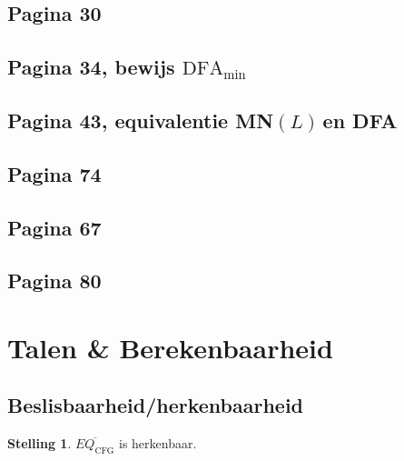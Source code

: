 \documentclass[kulak]{kulakarticle}
\newcommand{\DFA}{\text{DFA}}
\newcommand{\CFG}{\text{CFG}}
\newcommand{\mnl}{MN\((L)\)}
\theoremstyle{definition}
\newtheorem*{stelling}{Stelling}
\begin{document}
	

	\subsection*{Pagina 30}

	

	\newpage
	\subsection*{Pagina 34, bewijs \( \DFA_{\text{min}} \)}

	

	\newpage
	\subsection*{Pagina 43, equivalentie \mnl \,en DFA}

	

	\subsection*{Pagina 74}

	

	\subsection*{Pagina 67}

	

	\newpage
	\subsection*{Pagina 80}

	

	\newpage

	\section{Talen \& Berekenbaarheid}

	\subsection{Beslisbaarheid/herkenbaarheid}

	\begin{stelling}
		\(\overline{EQ_\CFG}\) is herkenbaar.
	\end{stelling}
\end{document}
